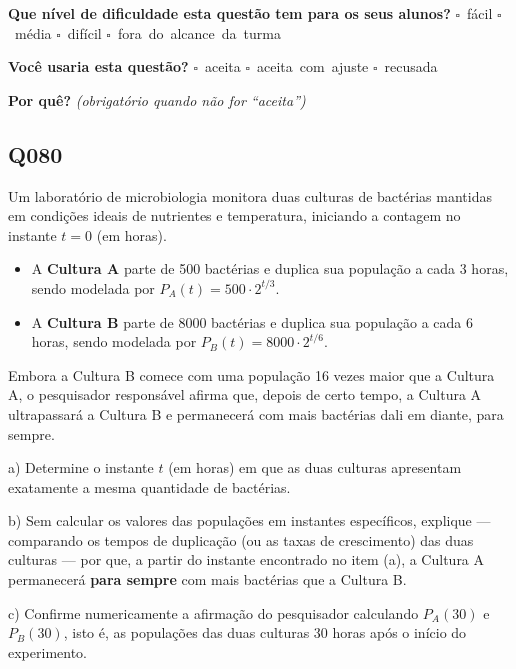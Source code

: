 \documentclass[11pt,a4paper]{article}
\begin{document}
\textbf{Que nível de dificuldade esta questão tem para os seus alunos?}\quad
\mbox{$\square$~fácil} \quad \mbox{$\square$~média} \quad
\mbox{$\square$~difícil} \quad \mbox{$\square$~fora do alcance da turma}

\textbf{Você usaria esta questão?}\quad
\mbox{$\square$~aceita} \quad \mbox{$\square$~aceita com ajuste} \quad
\mbox{$\square$~recusada}

\textbf{Por quê?} \emph{(obrigatório quando não for ``aceita'')}

\underline{\hspace{\linewidth}}

\underline{\hspace{\linewidth}}
\vspace{0.6em}

\begin{samepage}
\subsection*{Q080}
Um laboratório de microbiologia monitora duas culturas de bactérias mantidas em condições ideais de nutrientes e temperatura, iniciando a contagem no instante $t=0$ (em horas).

\begin{itemize}[nosep,leftmargin=*]
\item A \textbf{Cultura A} parte de 500 bactérias e duplica sua população a cada 3 horas, sendo modelada por $P_A(t) = 500 \cdot 2^{t/3}$.
\item A \textbf{Cultura B} parte de 8000 bactérias e duplica sua população a cada 6 horas, sendo modelada por $P_B(t) = 8000 \cdot 2^{t/6}$.
\end{itemize}

Embora a Cultura B comece com uma população 16 vezes maior que a Cultura A, o pesquisador responsável afirma que, depois de certo tempo, a Cultura A ultrapassará a Cultura B e permanecerá com mais bactérias dali em diante, para sempre.

a) Determine o instante $t$ (em horas) em que as duas culturas apresentam exatamente a mesma quantidade de bactérias.

b) Sem calcular os valores das populações em instantes específicos, explique — comparando os tempos de duplicação (ou as taxas de crescimento) das duas culturas — por que, a partir do instante encontrado no item (a), a Cultura A permanecerá \textbf{para sempre} com mais bactérias que a Cultura B.

c) Confirme numericamente a afirmação do pesquisador calculando $P_A(30)$ e $P_B(30)$, isto é, as populações das duas culturas 30 horas após o início do experimento.


\end{samepage}
\end{document}
